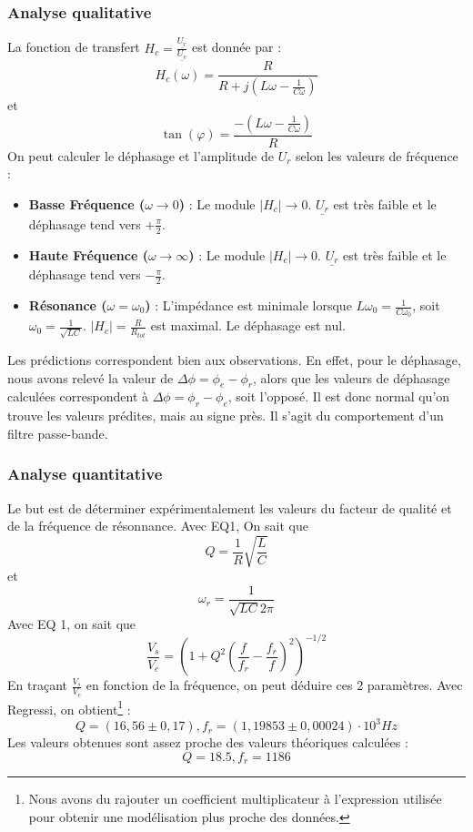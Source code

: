 \documentclass[a4paper,9pt,french]{scrartcl}
\begin{document}
\subsubsection{Analyse qualitative}
La fonction de transfert $H_c = \frac{\underline{U_r}}{\underline{U_e}}$ est donnée par :
\begin{equation}
H_c(\omega) = \frac{R}{R + j\left(L\omega - \frac{1}{C\omega}\right)}
\end{equation}
et
\begin{equation}
\tan(\varphi) = \frac{-(L\omega - \frac{1}{C\omega})}{R}
\end{equation}
On peut calculer le déphasage et l'amplitude de \(U_r\) selon les valeurs de fréquence :
\begin{itemize}
    \item \textbf{Basse Fréquence ($\omega \to 0$)} :  Le module $|H_c| \to 0$. $\underline{U_r}$ est très faible et le déphasage tend vers $+\frac{\pi}{2}$.
    \item \textbf{Haute Fréquence ($\omega \to \infty$)} : Le module $|H_c| \to 0$. $\underline{U_r}$ est très faible et le déphasage tend vers $-\frac{\pi}{2}$.
    \item \textbf{Résonance ($\omega = \omega_0$)} : L'impédance est minimale lorsque $L\omega_0 = \frac{1}{C\omega_0}$, soit $\omega_0 = \frac{1}{\sqrt{LC}}$. $|H_c| = \frac{R}{R_{tot}}$ est maximal. Le déphasage est nul.
\end{itemize}
Les prédictions correspondent bien aux observations. En effet, pour le déphasage, nous avons relevé la valeur de \(\Delta \phi = \phi_{e}-\phi_{r}\), alors que les valeurs de déphasage calculées correspondent à \(\Delta \phi = \phi_{r}-\phi_{e}\), soit l'opposé. Il est donc normal qu'on trouve les valeurs prédites, mais au signe près. Il s'agit du comportement d'un filtre passe-bande.
\subsubsection{Analyse quantitative}
Le but est de déterminer expérimentalement les valeurs du facteur de qualité et de la fréquence de résonnance. Avec EQ1, On sait que
\begin{equation}
Q = \frac{1}{R}\sqrt{\frac{L}{C}}
\end{equation}
et
\begin{equation}
\omega_r = \frac{1}{\sqrt{LC}2\pi}
\end{equation}
Avec EQ 1, on sait que
\begin{equation}
\frac{V_s}{V_e} = (1+Q^2(\frac{f}{f_r}-\frac{f_r}{f})^2)^{-1/2}
\end{equation}
En traçant $\frac{V_s}{V_e}$ en fonction de la fréquence, on peut déduire ces 2 paramètres. Avec Regressi, on obtient\footnote{Nous avons du rajouter un coefficient multiplicateur à l'expression utilisée pour obtenir une modélisation plus proche des données.} :
\[Q=(16,56\pm0,17), f_r=(1,19853 \pm 0,00024)\cdot 10^{3} Hz\]
Les valeurs obtenues sont assez proche des valeurs théoriques calculées :
\[Q = 18.5 , f_r = 1186\]
\end{document}
